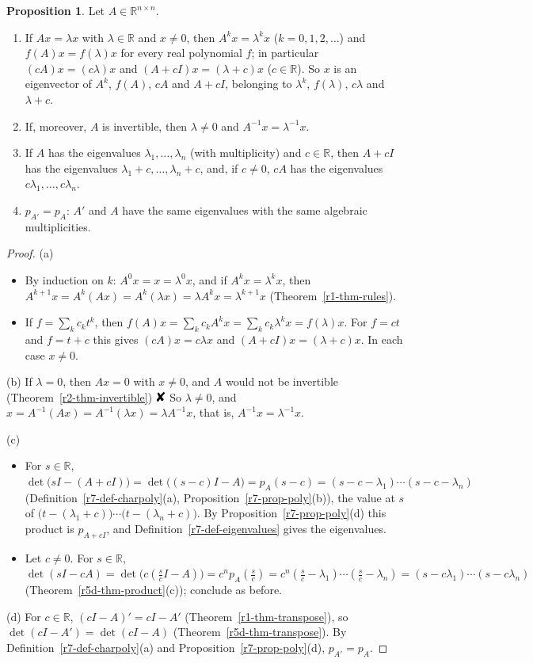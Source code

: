 \documentclass[12pt]{article}
\newcommand{\R}{\mathbb R}
\newcommand{\contradiction}{\mathord{\text{\large\ding{56}}}}
\theoremstyle{definition}
\newtheorem{proposition}[theorem]{Proposition}
\begin{document}
\begin{proposition}\label{r7-prop-eig-poly}
Let \(A\in\R^{n\times n}\).
\begin{enumerate}
\item If \(Ax=\lambda x\) with \(\lambda\in\R\) and \(x\ne0\), then \(A^kx=\lambda^kx\) (\(k=0,1,2,\dots\)) and
\(f(A)x=f(\lambda)x\) for every real polynomial \(f\); in particular \((cA)x=(c\lambda)x\) and \((A+cI)x=(\lambda+c)x\)
(\(c\in\R\)). So \(x\) is an eigenvector of \(A^k\), \(f(A)\), \(cA\) and \(A+cI\), belonging to \(\lambda^k\),
\(f(\lambda)\), \(c\lambda\) and \(\lambda+c\).
\item If, moreover, \(A\) is invertible, then \(\lambda\ne0\) and \(A^{-1}x=\lambda^{-1}x\).
\item If \(A\) has the eigenvalues \(\lambda_1,\dots,\lambda_n\) (with multiplicity) and \(c\in\R\), then \(A+cI\) has the
eigenvalues \(\lambda_1+c,\dots,\lambda_n+c\), and, if \(c\ne0\), \(cA\) has the eigenvalues \(c\lambda_1,\dots,c\lambda_n\).
\item \(p_{A'}=p_A\): \(A'\) and \(A\) have the same eigenvalues with the same algebraic multiplicities.
\end{enumerate}
\end{proposition}
\begin{proof}
(a)
\begin{itemize}
\item By induction on \(k\): \(A^0x=x=\lambda^0x\), and if \(A^kx=\lambda^kx\), then
\(A^{k+1}x=A^k(Ax)=A^k(\lambda x)=\lambda A^kx=\lambda^{k+1}x\) (Theorem~\ref{r1-thm-rules}).
\item If \(f=\sum_kc_kt^k\), then \(f(A)x=\sum_kc_kA^kx=\sum_kc_k\lambda^kx=f(\lambda)x\). For \(f=ct\) and \(f=t+c\) this
gives \((cA)x=c\lambda x\) and \((A+cI)x=(\lambda+c)x\). In each case \(x\ne0\).
\end{itemize}
(b) If \(\lambda=0\), then \(Ax=0\) with \(x\ne0\), and \(A\) would not be invertible (Theorem~\ref{r2-thm-invertible})
\(\contradiction\) So \(\lambda\ne0\), and \(x=A^{-1}(Ax)=A^{-1}(\lambda x)=\lambda A^{-1}x\), that is,
\(A^{-1}x=\lambda^{-1}x\).

(c)
\begin{itemize}
\item For \(s\in\R\), \(\det\bigl(sI-(A+cI)\bigr)=\det\bigl((s-c)I-A\bigr)=p_A(s-c)=(s-c-\lambda_1)\cdots(s-c-\lambda_n)\)
(Definition~\ref{r7-def-charpoly}(a), Proposition~\ref{r7-prop-poly}(b)), the value at \(s\) of
\(\bigl(t-(\lambda_1+c)\bigr)\cdots\bigl(t-(\lambda_n+c)\bigr)\). By Proposition~\ref{r7-prop-poly}(d) this product is
\(p_{A+cI}\), and Definition~\ref{r7-def-eigenvalues} gives the eigenvalues.
\item Let \(c\ne0\). For \(s\in\R\), \(\det(sI-cA)=\det\bigl(c(\tfrac scI-A)\bigr)=c^np_A(\tfrac sc)
=c^n(\tfrac sc-\lambda_1)\cdots(\tfrac sc-\lambda_n)=(s-c\lambda_1)\cdots(s-c\lambda_n)\)
(Theorem~\ref{r5d-thm-product}(c)); conclude as before.
\end{itemize}
(d) For \(c\in\R\), \((cI-A)'=cI-A'\) (Theorem~\ref{r1-thm-transpose}), so \(\det(cI-A')=\det(cI-A)\)
(Theorem~\ref{r5d-thm-transpose}). By Definition~\ref{r7-def-charpoly}(a) and Proposition~\ref{r7-prop-poly}(d),
\(p_{A'}=p_A\).
\end{proof}
\end{document}
